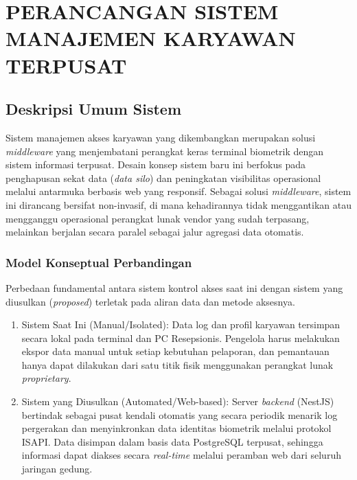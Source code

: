 \cleardoublepage
\chapter{PERANCANGAN SISTEM MANAJEMEN KARYAWAN TERPUSAT}
\label{chap:perancangan}

\section{Deskripsi Umum Sistem}
Sistem manajemen akses karyawan yang dikembangkan merupakan solusi \textit{middleware} yang menjembatani perangkat keras terminal biometrik dengan sistem informasi terpusat. Desain konsep sistem baru ini berfokus pada penghapusan sekat data (\textit{data silo}) dan peningkatan visibilitas operasional melalui antarmuka berbasis web yang responsif. Sebagai solusi \textit{middleware}, sistem ini dirancang bersifat non-invasif, di mana kehadirannya tidak menggantikan atau mengganggu operasional perangkat lunak vendor yang sudah terpasang, melainkan berjalan secara paralel sebagai jalur agregasi data otomatis.

\subsection{Model Konseptual Perbandingan}
Perbedaan fundamental antara sistem kontrol akses saat ini dengan sistem yang diusulkan (\textit{proposed}) terletak pada aliran data dan metode aksesnya. 

\begin{enumerate}
    \item Sistem Saat Ini (Manual/Isolated): Data log dan profil karyawan tersimpan secara lokal pada terminal dan PC Resepsionis. Pengelola harus melakukan ekspor data manual untuk setiap kebutuhan pelaporan, dan pemantauan hanya dapat dilakukan dari satu titik fisik menggunakan perangkat lunak \textit{proprietary}.
    \item Sistem yang Diusulkan (Automated/Web-based): Server \textit{backend} (NestJS) bertindak sebagai pusat kendali otomatis yang secara periodik menarik log pergerakan dan menyinkronkan data identitas biometrik melalui protokol ISAPI. Data disimpan dalam basis data PostgreSQL terpusat, sehingga informasi dapat diakses secara \textit{real-time} melalui peramban web dari seluruh jaringan gedung.
\end{enumerate}

